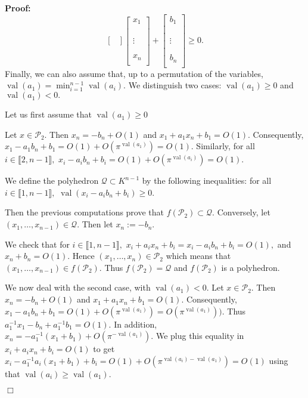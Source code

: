 \documentclass[a4paper,12pt]{article}
\newenvironment{proof}{\hbox{}\vspace{-0.8cm} {\bf Proof:}}{\hfill $\Box$}
\newcommand{\PP}{\mathcal{P}}
\newcommand{\Qc}{\mathcal{Q}}
\DeclareMathOperator{\val}{val}
\begin{document}
\begin{proof}
\[\begin{bmatrix}
\end{bmatrix} \begin{bmatrix} x_1 \\ \\  \\ \\ \vdots \\  \\ \\ x_n \\ \end{bmatrix} + \begin{bmatrix} b_1 \\ \\ \\  \\ \vdots  \\ \\ \\ b_n \\ \end{bmatrix}  \geq 0.\]
Finally, we can also assume that, up to a permutation of the variables, $\val(a_1)= \min_{i=1}^{n-1} \val(a_i).$
We distinguish two cases: $\val(a_1) \geq 0$ and $\val(a_1)<0.$

Let us first assume that $\val(a_1) \geq 0$

Let $x \in \PP_2$.
Then $x_n=-b_n+O(1)$
and $x_1+a_1 x_n+b_1=O(1).$
Consequently, $x_1-a_1 b_n +b_1=O(1)+O(\pi^{\val(a_1)})=O(1).$
Similarly, for all $i \in \llbracket 2,n-1 \rrbracket,$
$x_i-a_ib_n+b_i=O(1)+O(\pi^{\val(a_i)})=O(1).$

We define the polyhedron $\Qc \subset K^{n-1}$ by the following inequalities:
 for all $i \in \llbracket 1,n-1 \rrbracket,$
$\val(x_i-a_ib_n+b_i) \geq 0.$

Then the previous computations prove that $f(\PP_2)\subset \Qc.$
Conversely, let $(x_1,\dots,x_{n-1}) \in \Qc.$
Then let $x_n := -b_n.$

We check that for $i \in \llbracket 1,n-1 \rrbracket,$
$x_i+a_ix_n+b_i=x_i-a_ib_n+b_i=O(1),$
and $x_n+b_n=O(1)$. Hence $(x_1,\dots,x_n) \in \PP_2$
which means that $(x_1,\dots,x_{n-1}) \in f(\PP_2).$
Thus $f(\PP_2)= \Qc$ and $f(\PP_2)$ is a polyhedron.

We now deal with the second case, with $\val(a_1)<0.$
Let $x \in \PP_2$.
Then $x_n=-b_n+O(1)$
and $x_1+a_1 x_n+b_1=O(1).$
Consequently, $x_1-a_1 b_n +b_1=O(1)+O(\pi^{\val(a_1)})=O(\pi^{\val(a_1)})).$
Thus $a_1^{-1}x_1- b_n +a_1^{-1}b_1=O(1)$.
In addition, $x_n=-a_1^{-1}(x_1+b_1)+O(\pi^{-\val(a_1)}).$
We plug this equality in 
$x_i+a_i x_n+b_i=O(1)$ to get
$x_i-a_1^{-1}a_i(x_1+b_1)+b_i=O(1)+O(\pi^{\val(a_i)-\val(a_1)})=O(1)$
using that $\val(a_i) \geq \val (a_1).$


\end{proof}
\end{document}
